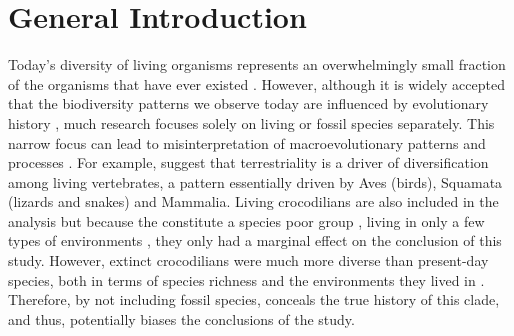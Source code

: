 \chapter{General Introduction}
\label{chap:introduction}




%
% 

Today's diversity of living organisms represents an overwhelmingly small fraction of the organisms that have ever existed \citep{novacek1992ext,raup1993extinction}.
However, although it is widely accepted that the biodiversity patterns %
we observe today are influenced by evolutionary history \citep{simpson1945,Gingerich1987,archibald2011extinction}, much research focuses solely on living or fossil species separately.
This narrow focus can lead to misinterpretation of macroevolutionary patterns and processes \citep{fritzdiversity2013,benton2015}.
For example, \cite{Wiens2015} suggest that terrestriality is a driver of diversification among living vertebrates, a pattern essentially driven by Aves (birds), Squamata (lizards and snakes) and Mammalia. 
Living crocodilians are also included in the analysis but because the constitute a species poor group \citep[25 species;][]{uetz2010original}, living in only a few types of environments \citep[marine or freshwater;][]{Martin2008}, they only had a marginal effect on the conclusion of this study.
However, extinct crocodilians were much more diverse than present-day species, both in terms of species richness \citep[at least 244 species are reported in][]{Bronzati2015} and the environments they lived in \citep[extinct crocodilians species ranged from fully marine ones to fully terrestrial ones -- including even few tree-dwelling! --][]{stubbs2013}.
Therefore, by not including fossil species, \cite{Wiens2015} conceals the true history of this clade, and thus, potentially biases the conclusions of the study.

